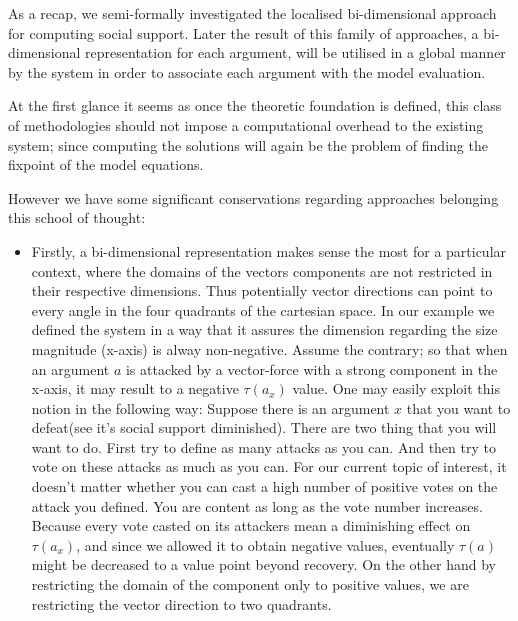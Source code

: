 \documentclass{article}
\begin{document}
{\begin{itemize}
\end{itemize}


As a recap, we semi-formally investigated the localised bi-dimensional approach for computing social support. Later the result of this family of approaches, a bi-dimensional representation for each argument, will be utilised in a global manner by the system in order to associate each argument with the model evaluation.


At the first glance it seems as once the theoretic foundation is defined, this class of methodologies should not impose a computational overhead to the existing system; since computing the solutions will again be the problem of finding the fixpoint of the model equations.

However we have some significant conservations regarding approaches belonging this school of thought:

\begin{itemize}
\item Firstly, a bi-dimensional representation makes sense the most for a particular context, where the domains of the vectors components are not restricted in their respective dimensions. Thus potentially vector directions can point to every angle in the four quadrants of the cartesian space. In our example we defined the system in a way that it assures the dimension regarding the size magnitude (x-axis) is alway non-negative. Assume the contrary; so that when an argument $a$ is attacked by a vector-force with a strong component in the x-axis, it may result to a negative $\tau(a_x)$ value. One may easily exploit this notion in the following way: Suppose there is an argument $x$ that you want to defeat(see it's social support diminished). There are two thing that you will want to do. First try to define as many attacks as you can. And then try to vote on these attacks as much as you can. For our current topic of interest, it doesn't matter whether you can cast a high number of positive votes on the attack you defined. You are content as long as the vote number increases. Because every vote casted on its attackers mean a diminishing effect on $\tau(a_x)$, and since we allowed it to obtain negative values, eventually $\tau(a)$ might be decreased to a value point beyond recovery. On the other hand by restricting the domain of the component only to positive values, we are restricting the vector direction to two quadrants.


\end{itemize}}
\end{document}
